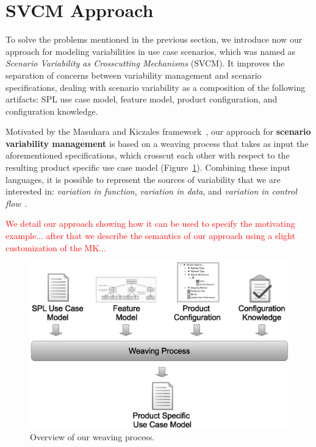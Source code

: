 \section{SVCM Approach}
\label{sec:models}

To solve the problems mentioned in the previous section, we introduce now our
approach for modeling variabilities in use case scenarios, which was named as
\emph{Scenario Variability as Crosscutting Mechanisms} (SVCM). It improves the
separation of concerns between variability management and scenario specifications, dealing with scenario variability as a composition of the
following artifacts: SPL use case model, feature model, product configuration,
and configuration knowledge. 

Motivated by the Masuhara and Kiczales
framework~\cite{Masuhara:2003aa}, our approach for \textbf{scenario variability
management} is based on a weaving process that takes as input the aforementioned
specifications, which crosscut each other with respect to the resulting product
specific use case model (Figure~\ref{fig:weave-process}). Combining these input
languages, it is possible to represent the sources of variability that we are
interested in: \emph{variation in function}, \emph{variation in data}, and
\emph{variation in control flow}~\cite{Bachmann:2001aa}.

\textcolor{red}{
We detail our approach showing how it
can be used to specify the motivating example... 
after that we describe the semantics of our approach using a slight
customization of the MK...
}

\begin{figure}[htb]
 \begin{center}
  \includegraphics[scale=0.30]{img/weave-process2.eps}
  \caption{Overview of our weaving process.}
  \label{fig:weave-process}
  \end{center}
\end{figure}

